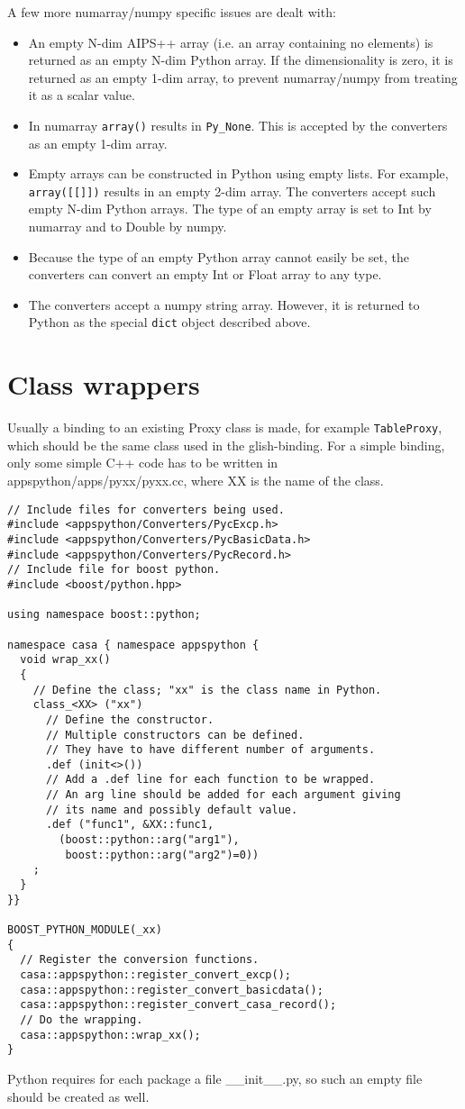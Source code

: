 A few more numarray/numpy specific issues are dealt with:
\begin{itemize}
\item An empty N-dim AIPS++ array (i.e. an array containing no elements) is
returned as an empty N-dim Python array. If the dimensionality is
zero, it is returned as an empty 1-dim array, to prevent numarray/numpy
from treating it as a scalar value.
\item In numarray \texttt{array()} results in \texttt{Py\_None}. This
is accepted by the converters as an empty 1-dim array.
\item Empty arrays can be constructed in Python using empty lists. For
example, \texttt{array([[]])} results in an empty 2-dim array. The
converters accept such empty N-dim Python arrays. The type of an empty
array is set to Int by numarray and to Double by numpy.
\item Because the type of an empty Python array cannot easily be set,
the converters can convert an empty Int or Float array to any type.
\item The converters accept a numpy string array. However, it is
returned to Python as the special \texttt{dict} object described above.
\end{itemize}

\section{Class wrappers}
Usually a binding to an existing Proxy class is made, for example
\texttt{TableProxy}, which should be the same class used in the
glish-binding. 
For a simple binding, only some simple C++ code has to be written in
appspython/apps/pyxx/pyxx.cc, where XX is the name of the class.
\begin{verbatim}
// Include files for converters being used.
#include <appspython/Converters/PycExcp.h>
#include <appspython/Converters/PycBasicData.h>
#include <appspython/Converters/PycRecord.h>
// Include file for boost python.
#include <boost/python.hpp>

using namespace boost::python;

namespace casa { namespace appspython {
  void wrap_xx()
  {
    // Define the class; "xx" is the class name in Python.
    class_<XX> ("xx")
      // Define the constructor.
      // Multiple constructors can be defined.
      // They have to have different number of arguments.
      .def (init<>())
      // Add a .def line for each function to be wrapped.
      // An arg line should be added for each argument giving
      // its name and possibly default value.
      .def ("func1", &XX::func1,
 	    (boost::python::arg("arg1"),
 	     boost::python::arg("arg2")=0))
    ;
  }
}}

BOOST_PYTHON_MODULE(_xx)
{
  // Register the conversion functions.
  casa::appspython::register_convert_excp();
  casa::appspython::register_convert_basicdata();
  casa::appspython::register_convert_casa_record();
  // Do the wrapping.
  casa::appspython::wrap_xx();
}
\end{verbatim}
Python requires for each package a file \_\_init\_\_.py, so such an empty
file should be created as well.

